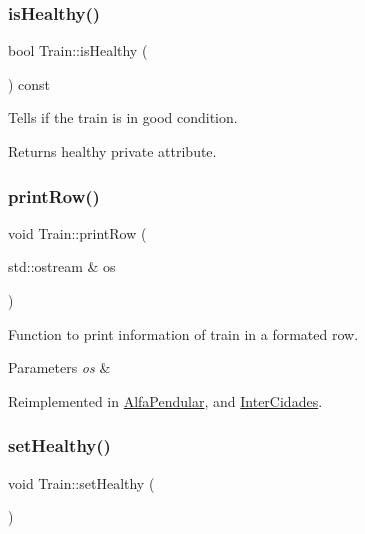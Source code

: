 \subsubsection{\texorpdfstring{is\+Healthy()}{isHealthy()}}
{\footnotesize\ttfamily bool Train\+::is\+Healthy (\begin{DoxyParamCaption}{ }\end{DoxyParamCaption}) const}

Tells if the train is in good condition.

\begin{DoxyReturn}{Returns}
healthy private attribute. 
\end{DoxyReturn}
\mbox{\label{classTrain_a3fd1c87c2152aa96cc6928f0aea37e21}} 
\subsubsection{\texorpdfstring{print\+Row()}{printRow()}}
{\footnotesize\ttfamily void Train\+::print\+Row (\begin{DoxyParamCaption}\item[{std\+::ostream \&}]{os }\end{DoxyParamCaption})\hspace{0.3cm}{\ttfamily [virtual]}}

Function to print information of train in a formated row.


\begin{DoxyParams}{Parameters}
{\em os} & \\
\hline
\end{DoxyParams}


Reimplemented in \mbox{\hyperlink{classAlfaPendular_aceb64b85c475612b8045d0108b448669}{Alfa\+Pendular}}, and \mbox{\hyperlink{classInterCidades_af3a946b18bb99a7d1372d2dad4588639}{Inter\+Cidades}}.

\mbox{\label{classTrain_a73909d49761b5152ee3bfc2e1b9d1325}} 
\subsubsection{\texorpdfstring{set\+Healthy()}{setHealthy()}}
{\footnotesize\ttfamily void Train\+::set\+Healthy (\begin{DoxyParamCaption}{ }\end{DoxyParamCaption})}

